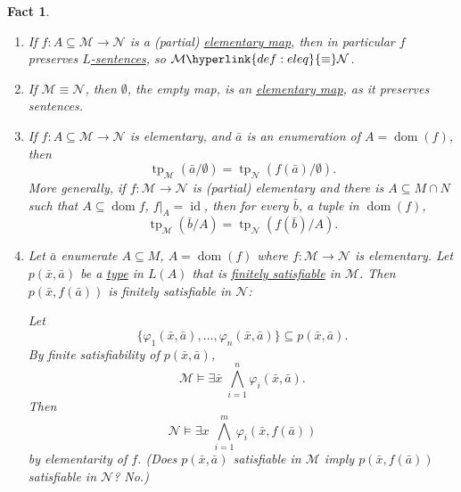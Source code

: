 \documentclass{article}
\let\models\vDash
\DeclareMathOperator{\dom}{dom}
\DeclareMathOperator{\tp}{tp}
\newtheorem{nfact}[nthm]{Fact}
\begin{document}
\begin{nfact}\label{fact:6.4}\leavevmode
  \begin{enumerate}[label=(\roman*)]
    \item If $f: A \subseteq \mathcal{M} \to \mathcal{N}$ is a (partial) \hyperlink{def:elmap}{elementary map}, then in particular $f$ preserves \hyperlink{def:sentence}{$L$-sentences}, so $\mathcal{M} \hyperlink{def:eleq}{\equiv} \mathcal{N}$.
    \item If $\mathcal{M} \equiv \mathcal{N}$, then $\emptyset$, the empty map, is an \hyperlink{def:el}{elementary map}, as it preserves sentences.
    \item If $f: A \subseteq \mathcal{M} \to \mathcal{N}$ is elementary, and $\bar{a}$ is an enumeration of $A = \dom(f)$, then
      \begin{equation*}
        \tp_\mathcal{M}(\bar{a}/\emptyset) = \tp_\mathcal{N}(f(\bar{a})/\emptyset).
      \end{equation*}
      More generally, if $f: \mathcal{M} \to \mathcal{N}$ is (partial) elementary and there is $A \subseteq M \cap N$ such that $A \subseteq \dom f$, $f|_A = \operatorname{id}$, then for every $\bar{b}$, a tuple in $\dom(f)$,
      \begin{equation*}
        \tp_\mathcal{M}(\bar{b}/A) = \tp_{\mathcal{N}}(f(\bar{b})/A).
      \end{equation*}
    \item Let $\bar{a}$ enumerate $A \subseteq M$, $A = \dom(f)$ where $f: \mathcal{M} \to \mathcal{N}$ is elementary.
      Let $p(\bar{x},\bar{a})$ be a \hyperlink{def:type}{type} in $L(A)$ that is \hyperlink{def:type}{finitely satisfiable} in $\mathcal{M}$.
      Then $p(\bar{x},f(\bar{a}))$ is finitely satisfiable in $\mathcal{N}$:

      Let
      \begin{equation*}\{\varphi_1(\bar{x},\bar{a}), \dotsc, \varphi_n(\bar{x},\bar{a})\} \subseteq p(\bar{x},\bar{a}).\end{equation*}
      By finite satisfiability of $p(\bar{x},\bar{a})$,
    \begin{equation*}\mathcal{M} \models \exists \bar{x} \; \bigwedge_{i=1}^n \varphi_i(\bar{x},\bar{a}).\end{equation*}
      Then
      \begin{equation*}\mathcal{N} \models \exists x \; \bigwedge_{i=1}^m \varphi_i(\bar{x},f(\bar{a}))\end{equation*}
      by elementarity of $f$.
      (Does $p(\bar{x},\bar{a})$ satisfiable in $\mathcal{M}$ imply $p(\bar{x},f(\bar{a}))$ satisfiable in $\mathcal{N}$? No.)
  \end{enumerate}
\end{nfact}
\end{document}

